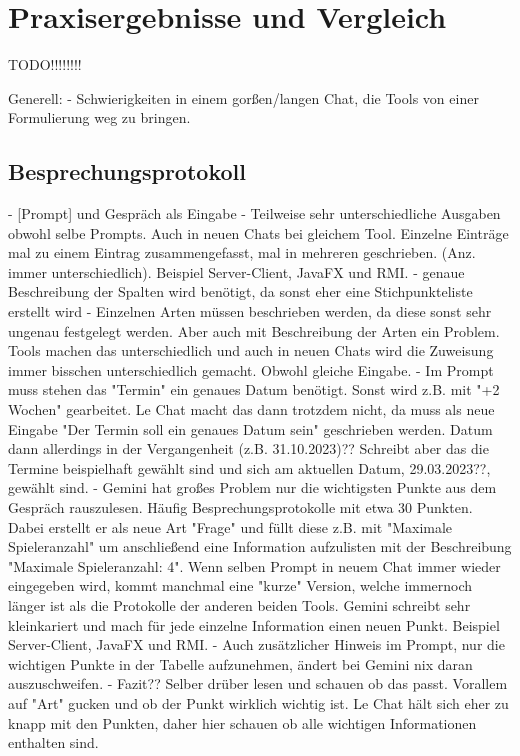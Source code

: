 
\chapter{Praxisergebnisse und Vergleich} 

TODO!!!!!!!!

Generell:
    - Schwierigkeiten in einem gorßen/langen Chat, die Tools von einer Formulierung weg zu bringen. 

\section{Besprechungsprotokoll}  \label{CompBesprechungsprotokoll}


- [Prompt] und Gespräch als Eingabe
- Teilweise sehr unterschiedliche Ausgaben obwohl selbe Prompts. Auch in neuen Chats bei gleichem Tool.
Einzelne Einträge mal zu einem Eintrag zusammengefasst, mal in mehreren geschrieben. (Anz. immer unterschiedlich).
Beispiel Server-Client, JavaFX und RMI.
- genaue Beschreibung der Spalten wird benötigt, da sonst eher eine Stichpunkteliste erstellt wird
- Einzelnen Arten müssen beschrieben werden, da diese sonst sehr ungenau festgelegt werden. Aber auch mit
Beschreibung der Arten ein Problem. Tools machen das unterschiedlich und auch in neuen Chats wird die Zuweisung immer 
bisschen unterschiedlich gemacht. Obwohl gleiche Eingabe.
- Im Prompt muss stehen das "Termin" ein genaues Datum benötigt. Sonst wird z.B. mit "+2 Wochen" gearbeitet. Le Chat 
macht das dann trotzdem nicht, da muss als neue Eingabe "Der Termin soll ein genaues Datum sein" geschrieben werden.
Datum dann allerdings in der Vergangenheit (z.B. 31.10.2023)?? Schreibt aber das die Termine beispielhaft gewählt sind
und sich am aktuellen Datum, 29.03.2023??, gewählt sind.
- Gemini hat großes Problem nur die wichtigsten Punkte aus dem Gespräch rauszulesen. Häufig Besprechungsprotokolle mit etwa 
30 Punkten. Dabei erstellt er als neue Art "Frage" und füllt diese z.B. mit "Maximale Spieleranzahl" um anschließend eine 
Information aufzulisten mit der Beschreibung "Maximale Spieleranzahl: 4". Wenn selben Prompt in neuem Chat immer wieder 
eingegeben wird, kommt manchmal eine "kurze" Version, welche immernoch länger ist als die Protokolle der anderen beiden Tools.
Gemini schreibt sehr kleinkariert und mach für jede einzelne Information einen neuen Punkt. Beispiel Server-Client, JavaFX und RMI.
- Auch zusätzlicher Hinweis im Prompt, nur die wichtigen Punkte in der Tabelle aufzunehmen, ändert bei Gemini nix daran auszuschweifen.
- Fazit?? Selber drüber lesen und schauen ob das passt. Vorallem auf "Art" gucken und ob der Punkt wirklich wichtig ist. Le Chat
hält sich eher zu knapp mit den Punkten, daher hier schauen ob alle wichtigen Informationen enthalten sind.

